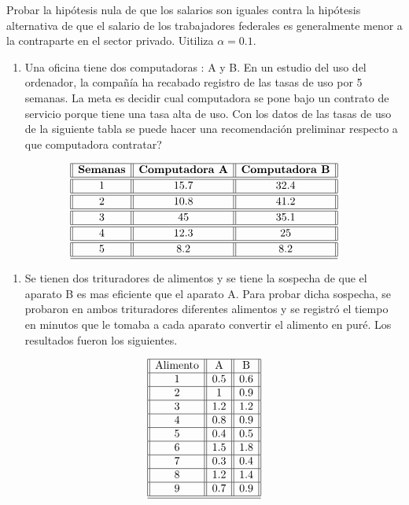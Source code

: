 \documentclass[
  a4paper,
  oneside,
  openany]{book}
\providecommand{\tightlist}{%
  \setlength{\itemsep}{0pt}\setlength{\parskip}{0pt}}
\begin{document}
Probar la hipótesis nula de que los salarios son iguales contra la hipótesis alternativa de que el salario de los trabajadores federales es generalmente menor a la contraparte en el sector privado. Uitiliza \(\alpha=0.1\).

\begin{enumerate}
\def\labelenumi{\arabic{enumi}.}
\setcounter{enumi}{1}
\tightlist
\item
  Una oficina tiene dos computadoras : A y B. En un estudio del uso del ordenador, la compañía ha recabado registro de las tasas de uso por 5 semanas. La meta es decidir cual computadora se pone bajo un contrato de servicio porque tiene una tasa alta de uso. Con los datos de las tasas de uso de la siguiente tabla se puede hacer una recomendación preliminar respecto a que computadora contratar?
\end{enumerate}

\[
\begin{array}{||c| |c| |c||} 
\hline 
\textbf{Semanas} & \textbf{Computadora A} & \textbf{Computadora B} \\ 
\hline
\hline
1 &15.7& 32.4 \\
\hline
\hline
2& 10.8 &41.2 \\
\hline
\hline
3 &45   & 35.1 \\
\hline
\hline
4 &12.3& 25 \\
\hline
\hline
5 & 8.2&8.2 \\
\hline
\hline
\end{array}
\]

\begin{enumerate}
\def\labelenumi{\arabic{enumi}.}
\setcounter{enumi}{2}
\tightlist
\item
  Se tienen dos trituradores de alimentos y se tiene la sospecha de que el aparato B es mas eficiente que el aparato A. Para probar dicha sospecha, se probaron en ambos trituradores diferentes alimentos y se registró el tiempo en minutos que le tomaba a cada aparato convertir el alimento en puré. Los resultados fueron los siguientes.
\end{enumerate}

\[
\begin{array}{||c| |c| |c| |c|} 
\hline 
\mbox{Alimento} & \mbox{A} & \mbox{B}\\
 \hline
1&0.5&0.6\\
 \hline
2&1&0.9\\
 \hline
3&1.2&1.2\\
 \hline
4&0.8&0.9\\
 \hline
5&0.4&0.5\\
 \hline
6&1.5&1.8\\
 \hline
7&0.3&0.4\\
 \hline
8&1.2&1.4\\
 \hline
9&0.7&0.9\\
\hline
\hline
\end{array}
\]
\end{document}
